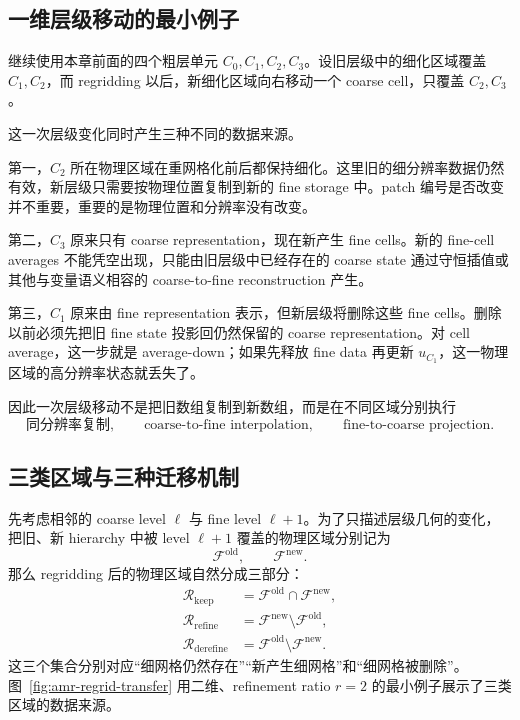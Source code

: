 \subsection{一维层级移动的最小例子}

继续使用本章前面的四个粗层单元 $C_0,C_1,C_2,C_3$。设旧层级中的细化区域覆盖 $C_1,C_2$，而 regridding 以后，新细化区域向右移动一个 coarse cell，只覆盖 $C_2,C_3$。

这一次层级变化同时产生三种不同的数据来源。

第一，$C_2$ 所在物理区域在重网格化前后都保持细化。这里旧的细分辨率数据仍然有效，新层级只需要按物理位置复制到新的 fine storage 中。patch 编号是否改变并不重要，重要的是物理位置和分辨率没有改变。

第二，$C_3$ 原来只有 coarse representation，现在新产生 fine cells。新的 fine-cell averages 不能凭空出现，只能由旧层级中已经存在的 coarse state 通过守恒插值或其他与变量语义相容的 coarse-to-fine reconstruction 产生。

第三，$C_1$ 原来由 fine representation 表示，但新层级将删除这些 fine cells。删除以前必须先把旧 fine state 投影回仍然保留的 coarse representation。对 cell average，这一步就是 average-down；如果先释放 fine data 再更新 $u_{C_1}$，这一物理区域的高分辨率状态就丢失了。

因此一次层级移动不是把旧数组复制到新数组，而是在不同区域分别执行
\begin{equation}
\boxed{
\text{同分辨率复制},
\qquad
\text{coarse-to-fine interpolation},
\qquad
\text{fine-to-coarse projection}.
}
\label{eq:amr-regrid-three-data-sources}
\end{equation}

\subsection{三类区域与三种迁移机制}

先考虑相邻的 coarse level $\ell$ 与 fine level $\ell+1$。为了只描述层级几何的变化，把旧、新 hierarchy 中被 level $\ell+1$ 覆盖的物理区域分别记为
\begin{equation}
\mathcal F^{\mathrm{old}},
\qquad
\mathcal F^{\mathrm{new}}.
\end{equation}
那么 regridding 后的物理区域自然分成三部分：
\begin{align}
\mathcal R_{\mathrm{keep}}
&=\mathcal F^{\mathrm{old}}\cap\mathcal F^{\mathrm{new}},
\\
\mathcal R_{\mathrm{refine}}
&=\mathcal F^{\mathrm{new}}\setminus\mathcal F^{\mathrm{old}},
\\
\mathcal R_{\mathrm{derefine}}
&=\mathcal F^{\mathrm{old}}\setminus\mathcal F^{\mathrm{new}}.
\label{eq:amr-regrid-region-decomposition}
\end{align}
这三个集合分别对应“细网格仍然存在”“新产生细网格”和“细网格被删除”。图~\ref{fig:amr-regrid-transfer} 用二维、refinement ratio $r=2$ 的最小例子展示了三类区域的数据来源。


